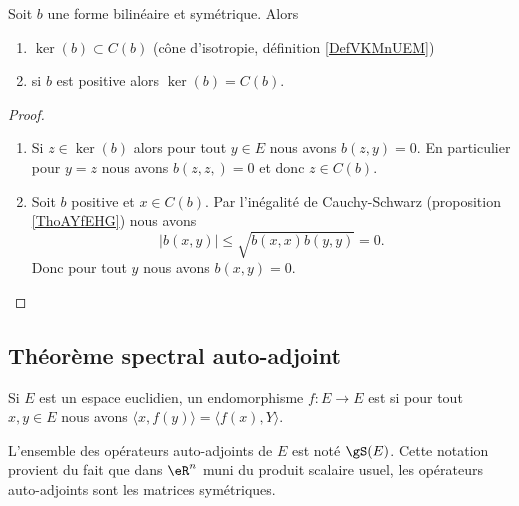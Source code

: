 \begin{proposition}     \label{PropHIWjdMX}
    Soit \( b\) une forme bilinéaire et symétrique. Alors
    \begin{enumerate}
        \item
            \( \ker(b)\subset C(b)\) (cône d'isotropie, définition \ref{DefVKMnUEM})
        \item
            si \( b\) est positive alors \( \ker(b)=C(b)\).
    \end{enumerate}
\end{proposition}

\begin{proof}
    \begin{enumerate}
        \item
            Si \( z\in\ker(b)\) alors pour tout \( y\in E\) nous avons \( b(z,y)=0\). En particulier pour \( y=z\) nous avons \( b(z,z,)=0\) et donc \( z\in C(b)\).
        \item
            Soit \( b\) positive et \( x\in C(b)\). Par l'inégalité de Cauchy-Schwarz (proposition \ref{ThoAYfEHG}) nous avons
            \begin{equation}
                | b(x,y) |\leq \sqrt{   b(x,x)b(y,y) }=0.
            \end{equation}
            Donc pour tout \( y\) nous avons \( b(x,y)=0\).
    \end{enumerate}
\end{proof}

\subsection{Théorème spectral auto-adjoint}

\begin{definition}
    Si \( E\) est un espace euclidien, un endomorphisme \( f\colon E\to E\) est  si pour tout \( x,y\in E\) nous avons \( \langle x, f(y)\rangle=\langle f(x), Y\rangle  \). 
\end{definition}
L'ensemble des opérateurs auto-adjoints de \( E\) est noté \( \gS(E)\). Cette notation provient du fait que dans \( \eR^n\) muni du produit scalaire usuel, les opérateurs auto-adjoints sont les matrices symétriques.

